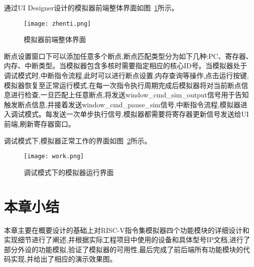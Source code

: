 通过UI Designer设计的模拟器前端整体界面如图~\ref{fig:zhenti}所示。
\begin{figure}[h]
    \centering
    \texttt{[image: zhenti.png]}
    \caption{模拟器前端整体界面}
    \label{fig:zhenti}
\end{figure}


断点设置窗口下可以添加任意多个断点,断点匹配类型分为如下几种:PC、寄存器、内存、中断类型。当模拟器包含多核时需要指定相应的核心ID号。当模拟器处于调试模式时,中断指令流程,此时可以进行断点设置,内存查询等操作,点击运行按键,模拟器恢复至正常运行模式,在每一次指令执行周期完成后模拟器将对当前断点信息进行检查,一旦匹配上任意断点,将发送window\_cmd\_sim\_output信号用于告知触发断点信息,并接着发送window\_cmd\_pause\_sim信号,中断指令流程,模拟器进入调试模式。每发送一次单步执行信号,模拟器都需要将寄存器更新信号发送给UI前端,刷新寄存器窗口。




        
        
        


调试模式下,模拟器正常工作的界面如图~\ref{fig:work}所示。
\begin{figure}[H]
    \centering
    \texttt{[image: work.png]}
    \caption{调试模式下的模拟器运行界面}
    \label{fig:work}
\end{figure}


\section{本章小结}
本章主要在概要设计的基础上对RISC-V指令集模拟器四个功能模块的详细设计和实现细节进行了阐述,并根据实际工程项目中使用的设备和具体型号IP文档,进行了部分外设的功能模拟,验证了模拟器的可用性,最后完成了前后端所有功能模块的代码实现,并给出了相应的演示效果图。


